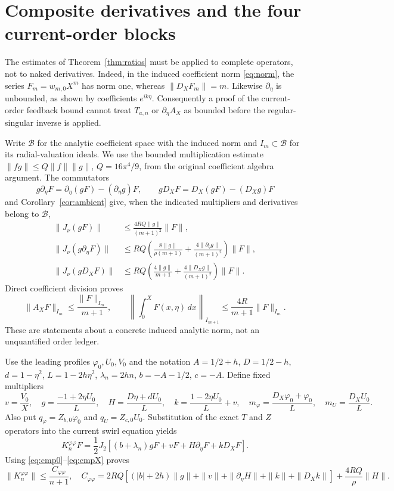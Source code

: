 
\section{Composite derivatives and the four current-order blocks}
The estimates of Theorem~\ref{thm:ratios} must be applied to complete
operators, not to naked derivatives. Indeed, in the induced coefficient
norm \eqref{eq:norm}, the series $F_m=w_{m,0}X^m$ has norm one, whereas
$\|D_XF_m\|=m$. Likewise $\partial_\eta$ is unbounded, as shown by
coefficients $e^{ik\eta}$. Consequently a proof of the current-order
feedback bound cannot treat $T_{a,n}$ or $\partial_\eta A_X$ as bounded
before the regular-singular inverse is applied.

Write $\mathcal B$ for the analytic coefficient space with the induced
norm and $I_m\subset\mathcal B$ for its radial-valuation ideals.
We use the bounded multiplication estimate
$\|fg\|\le Q\|f\|\|g\|$, $Q=16\pi^4/9$, from the original coefficient
algebra argument. The commutators
\[
 g\partial_\eta F=\partial_\eta(gF)-(\partial_\eta g)F,\qquad
 gD_XF=D_X(gF)-(D_Xg)F
\]
and Corollary~\ref{cor:ambient} give, when the indicated multipliers
and derivatives belong to $\mathcal B$,
\begin{align}
 \|J_\nu(gF)\|&\le\frac{4RQ\|g\|}{(m+1)^2}\|F\|,\label{eq:cmp0}\\
 \|J_\nu(g\partial_\eta F)\|&\le RQ
 \left(\frac{8\|g\|}{\rho(m+1)}
 +\frac{4\|\partial_\eta g\|}{(m+1)^2}\right)\|F\|,\label{eq:cmp1}\\
 \|J_\nu(gD_XF)\|&\le RQ
 \left(\frac{4\|g\|}{m+1}
 +\frac{4\|D_Xg\|}{(m+1)^2}\right)\|F\|.\label{eq:cmpX}
\end{align}
Direct coefficient division proves
\[
 \|A_XF\|_{I_m}\le\frac{\|F\|_{I_m}}{m+1},\qquad
 \left\|\int_0^X F(x,\eta)\,dx\right\|_{I_{m+1}}
 \le\frac{4R}{m+1}\|F\|_{I_m}.
\]
These are statements about a concrete induced analytic norm, not an
unquantified order ledger.

Use the leading profiles $\varphi_0,U_0,V_0$ and the notation
$A=1/2+h$, $D=1/2-h$, $d=1-\eta^2$, $L=1-2h\eta^2$,
$\lambda_n=2hn$, $b=-A-1/2$, $c=-A$. Define fixed multipliers
\begin{equation}\label{eq:mult}
 v=\frac{V_0}{X},\quad g=\frac{-1+2\eta U_0}{L},\quad
 H=\frac{D\eta+dU_0}{L},\quad
 k=\frac{1-2\eta U_0}{L}+v,\quad
 m_\varphi=\frac{D_X\varphi_0+\varphi_0}{L},\quad
 m_U=\frac{D_XU_0}{L}.
\end{equation}
Also put $q_\varphi=Z_{b,0}\varphi_0$ and $q_U=Z_{c,0}U_0$.
Substitution of the exact $T$ and $Z$ operators into the
current swirl equation yields
\begin{equation}\label{eq:phiphi}
 K_n^{\varphi\varphi}F=\frac12 J_2
 [(b+\lambda_n)gF+vF+H\partial_\eta F+kD_XF].
\end{equation}
Using \eqref{eq:cmp0}--\eqref{eq:cmpX} proves
\begin{equation}\label{eq:cpp}
 \|K_n^{\varphi\varphi}\|\le\frac{C_{\varphi\varphi}}{n+1},\quad
 C_{\varphi\varphi}=2RQ[(|b|+2h)\|g\|+\|v\|
 +\|\partial_\eta H\|+\|k\|+\|D_Xk\|]
 +\frac{4RQ}{\rho}\|H\|.
\end{equation}

